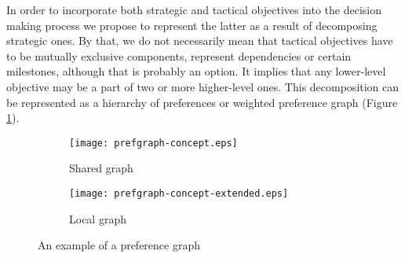 



In order to incorporate both strategic and tactical objectives into the decision making process we propose to represent
the latter as a result of decomposing strategic ones. By that, we do not necessarily mean that tactical objectives have
to be mutually exclusive components, represent dependencies or certain milestones, although that is probably an option.
It implies that any lower-level objective may be a part of two or more higher-level ones. This decomposition can be
represented as a hierarchy of preferences or weighted preference graph (Figure \ref{fig:prefgraph-concept-shared}).

\begin{figure}[hbt!]
    \centering
    \begin{subfigure}{.45\linewidth}
        \texttt{[image: prefgraph-concept.eps]}
        \caption{Shared graph}\label{fig:prefgraph-concept-shared}
    \end{subfigure}
    \begin{subfigure}{.45\linewidth}
        \texttt{[image: prefgraph-concept-extended.eps]}
        \caption{Local graph}\label{fig:prefgraph-concept-local}
    \end{subfigure}

    \caption{\small An example of a preference graph}
    \label{fig:prefgraph-concept}
\end{figure}

